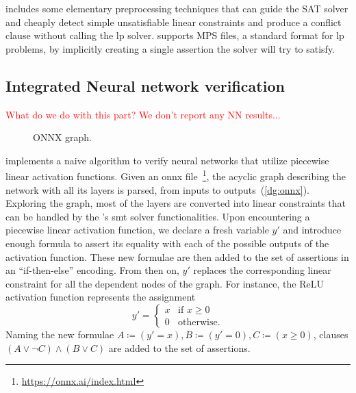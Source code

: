 \documentclass[runningheads]{llncs}
\begin{document}
\dlinear includes some elementary preprocessing techniques that can guide the SAT solver and cheaply detect simple unsatisfiable linear constraints and produce a conflict clause without calling the \gls{lp} solver.
\dlinear supports MPS files, a standard format for \gls{lp} problems, by implicitly creating a single assertion the solver will try to satisfy.

\subsection{Integrated Neural network verification}
\label{sec:nn-verification}

\textcolor{red}{What do we do with this part? We don't report any NN results...}

\begin{figure}
    \captionsetup{font=small}
    \vspace{-1cm}
    \resizebox{1.04\linewidth}{!}{%
        
    }
    \caption{ONNX graph.}
    \label{dg:onnx}
\end{figure}

\dlinear implements a naive algorithm to verify neural networks that utilize piecewise linear activation functions.
Given an \gls{onnx} file~\footnote{\url{https://onnx.ai/index.html}}, the acyclic graph describing the network with all its layers is parsed, from inputs to outputs~(\autoref{dg:onnx}).
Exploring the graph, most of the layers are converted into linear constraints that can be handled by the \dlinear's \gls{smt} solver functionalities.
Upon encountering a piecewise linear activation function, we declare a fresh variable $y'$ and introduce enough formula to assert its equality with each of the possible outputs of the activation function.
These new formulae are then added to the set of assertions in an ``if-then-else'' encoding.
From then on, $y'$ replaces the corresponding linear constraint for all the dependent nodes of the graph.
For instance, the ReLU activation function represents the assignment
\begin{equation*}
    y' = \begin{cases}
        x & \text{if } x \ge 0 \\
        0 & \text{otherwise} .
    \end{cases}
\end{equation*}
Naming the new formulae $A \coloneqq (y' = x), B \coloneqq (y' = 0), C \coloneqq (x \ge 0)$, clauses $(A \lor \neg C) \land (B \lor C)$ are added to the set of assertions.
\end{document}
